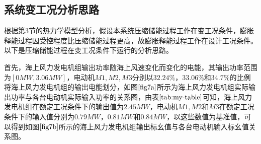 \documentclass{jnuthesis}
\begin{document}
	\subsection{系统变工况分析思路}
	
	\par 根据第3节的热力学模型分析，假设本系统压缩储能过程工作在变工况条件，膨胀释能过程因受控程度比压缩储能过程更高，故膨胀释能过程工作在设计工况条件。以下是压缩储能过程在变工况条件下运行的分析思路。
	\par 
	首先，海上风力发电机组输出功率随海上风速变化而变化的电能，其输出功率范围为$ [0MW,3.06MW] $，电动机$ M1,M2,M3 $分别以$ 32.24\%，33.06\% $和$ 34.7\% $的比例将海上风力发电机组的输出电能划分，如图$ \fontsize{10.5bp}{10pt}\ref{fig7a} $所示为海上风力发电机组实际输出功率与各台电动机实际输入功率的关系图，由表$ \fontsize{10.5bp}{10pt}\ref{tab:my-table} $可知，海上风力发电机组在额定工况条件下的输出值为$ 2.45MW $，电动机$ M1,M2 $和$ M3 $在额定工况条件下的输入值分别为$ 0.79MW，0.81MW $和$ 0.84MW $，以这些数值为基准值，可以得到如图$ \fontsize{10.5bp}{10pt}\ref{fig7b} $所示的海上风力发电机组输出标幺值与各台电动机输入标幺值关系图。
	
\end{document}
